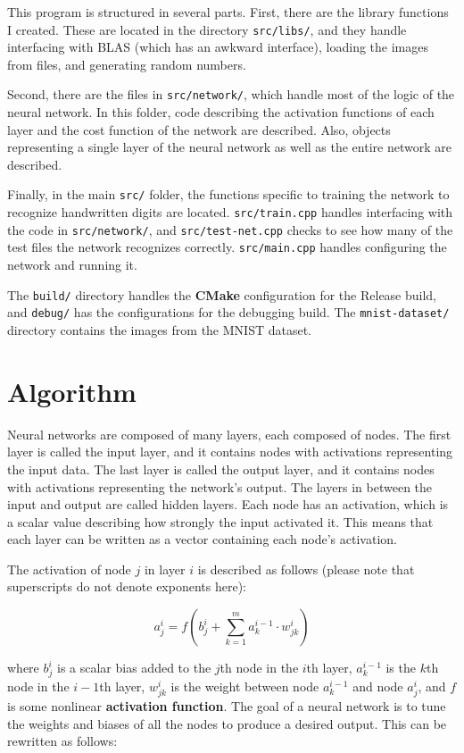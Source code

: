 \documentclass[12pt]{article}
\begin{document}
This program is structured in several parts. 
First, there are the library functions I created.
These are located in the directory \verb|src/libs/|, and they handle interfacing with BLAS (which has an awkward interface), loading the images from files, and generating random numbers.

Second, there are the files in \verb|src/network/|, which handle most of the logic of the neural network.
In this folder, code describing the activation functions of each layer and the cost function of the network are described.
Also, objects representing a single layer of the neural network as well as the entire network are described.

Finally, in the main \verb|src/| folder, the functions specific to training the network to recognize handwritten digits are located.
\verb|src/train.cpp| handles interfacing with the code in \verb|src/network/|, and \verb|src/test-net.cpp| checks to see how many of the test files the network recognizes correctly.
\verb|src/main.cpp| handles configuring the network and running it.

The \verb|build/| directory handles the \textbf{CMake} configuration for the Release build, and \verb|debug/| has the configurations for the debugging build.
The \verb|mnist-dataset/| directory contains the images from the MNIST dataset.

\section{Algorithm}

Neural networks are composed of many layers, each composed of nodes.
The first layer is called the input layer, and it contains nodes with activations representing the input data.
The last layer is called the output layer, and it contains nodes with activations representing the network's output.
The layers in between the input and output are called hidden layers.
Each node has an activation, which is a scalar value describing how strongly the input activated it.
This means that each layer can be written as a vector containing each node's activation.

The activation of node $j$ in layer $i$ is described as follows (please note that superscripts do not denote exponents here):

\[
a_j^i = f\left(b_j^i + \sum_{k = 1}^{m} a_k^{i-1} \cdot w_{jk}^i\right)
\]

where $b_j^i$ is a scalar bias added to the $j$th node in the $i$th layer, $a_k^{i-1}$ is the $k$th node in the $i-1$th layer, $w_{jk}^i$ is the weight between node $a_k^{i-1}$ and node $a_j^i$, and $f$ is some nonlinear \textbf{activation function}.
The goal of a neural network is to tune the weights and biases of all the nodes to produce a desired output.
This can be rewritten as follows:
\end{document}
